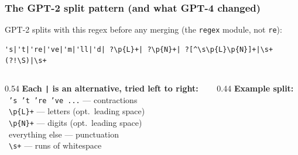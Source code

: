 \documentclass[aspectratio=169]{beamer}
\begin{document}
\begin{frame}[fragile]
\frametitle{The GPT-2 split pattern (and what GPT-4 changed)}
\vspace{-0.1cm}
{\small GPT-2 splits with this regex before any merging (the \texttt{regex} module, not \texttt{re}):}

\vspace{0.1cm}
\begin{lstlisting}[language={}, basicstyle=\ttfamily\scriptsize, keywordstyle={}, stringstyle={}, commentstyle={}, breaklines=true]
's|'t|'re|'ve|'m|'ll|'d| ?\p{L}+| ?\p{N}+| ?[^\s\p{L}\p{N}]+|\s+(?!\S)|\s+
\end{lstlisting}

\vspace{0.15cm}
\begin{columns}[T]
\begin{column}{0.54\textwidth}
{\small
\textbf{Each \texttt{|} is an alternative, tried left to right:}\\[6pt]
\textbullet\ \texttt{'s 't 're 've ...} --- contractions\\[4pt]
\textbullet\ \texttt{\textbackslash p\{L\}+} --- letters (opt.\ leading space)\\[4pt]
\textbullet\ \texttt{\textbackslash p\{N\}+} --- digits (opt.\ leading space)\\[4pt]
\textbullet\ everything else --- punctuation\\[4pt]
\textbullet\ \texttt{\textbackslash s+} --- runs of whitespace
}
\end{column}
\begin{column}{0.44\textwidth}
{\small \textbf{Example split:}}\\[4pt]
\end{column}
\end{columns}

\vspace{0.15cm}
\begin{center}
\end{center}
\end{frame}
\end{document}
